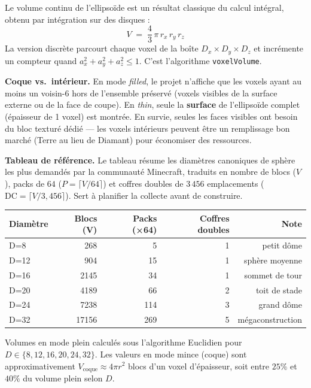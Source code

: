 \documentclass[12pt,a4paper]{scrartcl}
\newcommand{\code}[1]{\texttt{\small #1}}
\newcommand{\acc}[1]{\textcolor{accent}{\textbf{#1}}}
\begin{document}
Le volume continu de l'ellipsoïde est un résultat classique du calcul intégral, obtenu par intégration sur des disques :
\[
V \;=\; \dfrac{4}{3}\,\pi\, r_x\, r_y\, r_z
\]
La version discrète parcourt chaque voxel de la boîte $D_x \times D_y \times D_z$ et incrémente un compteur quand $a_x^2 + a_y^2 + a_z^2 \leq 1$. C'est l'algorithme \code{voxelVolume}.

\textbf{Coque vs.\ intérieur.} En mode \emph{filled}, le projet n'affiche que les voxels ayant au moins un voisin-6 hors de l'ensemble préservé (voxels visibles de la surface externe ou de la face de coupe). En \emph{thin}, seule la \acc{surface} de l'ellipsoïde complet (épaisseur de 1 voxel) est montrée. En survie, seules les faces visibles ont besoin du bloc texturé dédié --- les voxels intérieurs peuvent être un remplissage bon marché (Terre au lieu de Diamant) pour économiser des ressources.

\begin{minec}
\textbf{Tableau de référence.} Le tableau résume les diamètres canoniques de sphère les plus demandés par la communauté Minecraft, traduits en nombre de blocs ($V$), packs de $64$ ($P=\lceil V/64\rceil$) et coffres doubles de $3\,456$ emplacements ($\mathrm{DC}=\lceil V/3{,}456 \rceil$). Sert à planifier la collecte avant de construire.
\end{minec}

\vspace{0.5em}
\begin{center}
\begin{tabular}{@{}lrrrr@{}}
\toprule
\textbf{Diamètre} & \textbf{Blocs (V)} & \textbf{Packs (×64)} & \textbf{Coffres doubles} & \textbf{Note} \\
\midrule
D=8   &   268 &  5  & 1 & petit dôme  \\
D=12  &   904 & 15  & 1 & sphère moyenne \\
D=16  &  2145 & 34  & 1 & sommet de tour \\
D=20  &  4189 & 66  & 2 & toit de stade \\
D=24  &  7238 & 114 & 3 & grand dôme \\
D=32  & 17156 & 269 & 5 & mégaconstruction \\
\bottomrule
\end{tabular}
\end{center}

Volumes en mode plein calculés sous l'algorithme Euclidien pour $D \in \{8,12,16,20,24,32\}$. Les valeurs en mode mince (coque) sont approximativement $V_{\mathrm{coque}} \approx 4\pi r^2$ blocs d'un voxel d'épaisseur, soit entre $25\%$ et $40\%$ du volume plein selon $D$.
\end{document}
